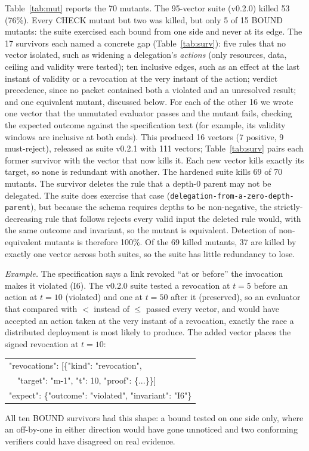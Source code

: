 \documentclass[conference]{IEEEtran}
\newcommand{\pres}{\textsf{preserved}}
\newcommand{\viol}{\textsf{violated}}
\newcommand{\unres}{\textsf{unresolved}}
\newcommand{\vname}[1]{{\small\nolinkurl{#1}}}
\begin{document}
Table~\ref{tab:mut} reports the 70 mutants. The 95-vector suite (v0.2.0) killed 53 (76\%). Every CHECK mutant but two was killed, but only 5 of 15 BOUND mutants: the suite exercised each bound from one side and never at its edge. The 17 survivors each named a concrete gap (Table~\ref{tab:surv}): five rules that no vector isolated, such as widening a delegation's \emph{actions} (only resources, data, ceiling and validity were tested); ten inclusive edges, such as an effect at the last instant of validity or a revocation at the very instant of the action; verdict precedence, since no packet contained both a \viol{} and an \unres{} result; and one equivalent mutant, discussed below. For each of the other 16 we wrote one vector that the unmutated evaluator passes and the mutant fails, checking the expected outcome against the specification text (for example, its validity windows are inclusive at both ends). This produced 16 vectors (7 positive, 9 must-reject), released as suite v0.2.1 with 111 vectors; Table~\ref{tab:surv} pairs each former survivor with the vector that now kills it. Each new vector kills exactly its target, so none is redundant with another. The hardened suite kills 69 of 70 mutants. The survivor deletes the rule that a depth-0 parent may not be delegated. The suite does exercise that case (\vname{delegation-from-a-zero-depth-parent}), but because the schema requires depths to be non-negative, the strictly-decreasing rule that follows rejects every valid input the deleted rule would, with the same outcome and invariant, so the mutant is equivalent. Detection of non-equivalent mutants is therefore 100\%. Of the 69 killed mutants, 37 are killed by exactly one vector across both suites, so the suite has little redundancy to lose.

\emph{Example.} The specification says a link revoked ``at or before'' the invocation makes it \viol{} (I6). The v0.2.0 suite tested a revocation at $t{=}5$ before an action at $t{=}10$ (\viol{}) and one at $t{=}50$ after it (\pres{}), so an evaluator that compared with $<$ instead of $\le$ passed every vector, and would have accepted an action taken at the very instant of a revocation, exactly the race a distributed deployment is most likely to produce. The added vector places the signed revocation at $t{=}10$:
\begin{center}\scriptsize\ttfamily
\begin{tabular}{@{}l@{}}
"revocations": [\{"kind": "revocation",\\
\ \ "target": "m-1", "t": 10, "proof": \{...\}\}]\\
"expect": \{"outcome": "violated", "invariant": "I6"\}
\end{tabular}
\end{center}
All ten BOUND survivors had this shape: a bound tested on one side only, where an off-by-one in either direction would have gone unnoticed and two conforming verifiers could have disagreed on real evidence.
\end{document}
